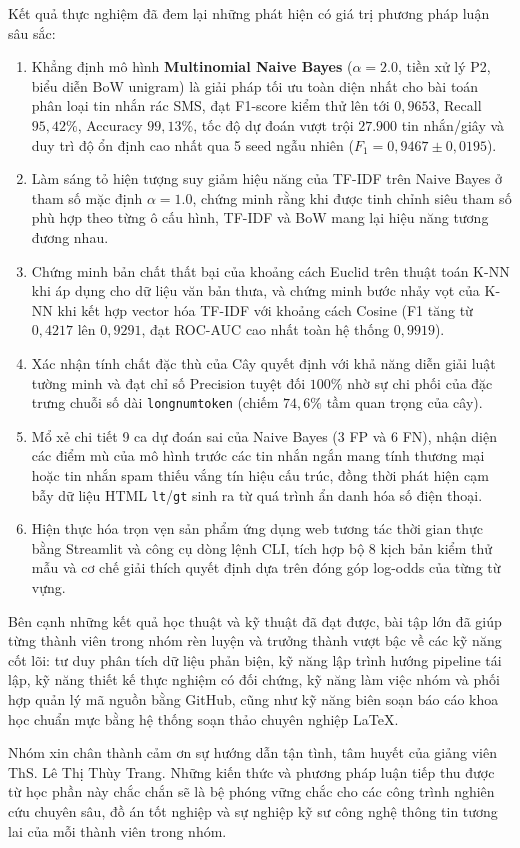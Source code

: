 Kết quả thực nghiệm đã đem lại những phát hiện có giá trị phương pháp luận sâu sắc:
\begin{enumerate}
    \item Khẳng định mô hình \textbf{Multinomial Naive Bayes} ($\alpha=2.0$, tiền xử lý P2, biểu diễn BoW unigram) là giải pháp tối ưu toàn diện nhất cho bài toán phân loại tin nhắn rác SMS, đạt F1-score kiểm thử lên tới \textbf{$0,9653$}, Recall \textbf{$95,42\%$}, Accuracy \textbf{$99,13\%$}, tốc độ dự đoán vượt trội $27.900$ tin nhắn/giây và duy trì độ ổn định cao nhất qua 5 seed ngẫu nhiên ($F_1 = 0,9467 \pm 0,0195$).
    \item Làm sáng tỏ hiện tượng suy giảm hiệu năng của TF-IDF trên Naive Bayes ở tham số mặc định $\alpha=1.0$, chứng minh rằng khi được tinh chỉnh siêu tham số phù hợp theo từng ô cấu hình, TF-IDF và BoW mang lại hiệu năng tương đương nhau.
    \item Chứng minh bản chất thất bại của khoảng cách Euclid trên thuật toán K-NN khi áp dụng cho dữ liệu văn bản thưa, và chứng minh bước nhảy vọt của K-NN khi kết hợp vector hóa TF-IDF với khoảng cách Cosine (F1 tăng từ $0,4217$ lên $0,9291$, đạt ROC-AUC cao nhất toàn hệ thống $0,9919$).
    \item Xác nhận tính chất đặc thù của Cây quyết định với khả năng diễn giải luật tường minh và đạt chỉ số Precision tuyệt đối $100\%$ nhờ sự chi phối của đặc trưng chuỗi số dài \texttt{longnumtoken} (chiếm $74,6\%$ tầm quan trọng của cây).
    \item Mổ xẻ chi tiết 9 ca dự đoán sai của Naive Bayes (3 FP và 6 FN), nhận diện các điểm mù của mô hình trước các tin nhắn ngắn mang tính thương mại hoặc tin nhắn spam thiếu vắng tín hiệu cấu trúc, đồng thời phát hiện cạm bẫy dữ liệu HTML \texttt{lt}/\texttt{gt} sinh ra từ quá trình ẩn danh hóa số điện thoại.
    \item Hiện thực hóa trọn vẹn sản phẩm ứng dụng web tương tác thời gian thực bằng Streamlit và công cụ dòng lệnh CLI, tích hợp bộ 8 kịch bản kiểm thử mẫu và cơ chế giải thích quyết định dựa trên đóng góp log-odds của từng từ vựng.
\end{enumerate}

Bên cạnh những kết quả học thuật và kỹ thuật đã đạt được, bài tập lớn đã giúp từng thành viên trong nhóm rèn luyện và trưởng thành vượt bậc về các kỹ năng cốt lõi: tư duy phân tích dữ liệu phản biện, kỹ năng lập trình hướng pipeline tái lập, kỹ năng thiết kế thực nghiệm có đối chứng, kỹ năng làm việc nhóm và phối hợp quản lý mã nguồn bằng GitHub, cũng như kỹ năng biên soạn báo cáo khoa học chuẩn mực bằng hệ thống soạn thảo chuyên nghiệp \LaTeX.

Nhóm xin chân thành cảm ơn sự hướng dẫn tận tình, tâm huyết của giảng viên ThS. Lê Thị Thùy Trang. Những kiến thức và phương pháp luận tiếp thu được từ học phần này chắc chắn sẽ là bệ phóng vững chắc cho các công trình nghiên cứu chuyên sâu, đồ án tốt nghiệp và sự nghiệp kỹ sư công nghệ thông tin tương lai của mỗi thành viên trong nhóm.